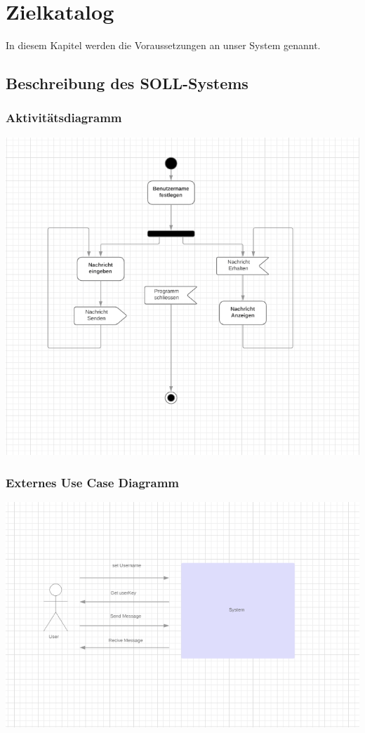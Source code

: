 \documentclass[12pt]{article}
\begin{document}
  \section{Zielkatalog}
    In diesem Kapitel werden die Voraussetzungen an unser System genannt.

    \subsection{Beschreibung des SOLL-Systems}
      \subsubsection{Aktivitätsdiagramm}
        \includegraphics[width=\textwidth]{activity-diagram.png}
      \subsubsection{Externes Use Case Diagramm}
        \includegraphics[width=\textwidth]{extern-usecase.png}
\end{document}
